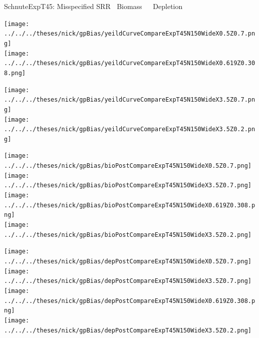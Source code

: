 \documentclass[ xcolor = pdftex, dvipsnames, table ]{beamer}
\begin{document}
%
\begin{frame}{SchnuteExpT45: Misspecified SRR $~$ Biomass $~~~~$ Depletion}
$~$
\hspace*{-1.25cm}
\begin{minipage}[h!]{0.25\textwidth}
\texttt{[image: ../../../theses/nick/gpBias/yeildCurveCompareExpT45N150WideX0.5Z0.7.png]}\\
\texttt{[image: ../../../theses/nick/gpBias/yeildCurveCompareExpT45N150WideX0.619Z0.308.png]}
\end{minipage}
\begin{minipage}[h!]{0.25\textwidth}
\hspace*{0.45cm}
\texttt{[image: ../../../theses/nick/gpBias/yeildCurveCompareExpT45N150WideX3.5Z0.7.png]}\\
\hspace*{0.45cm}
\texttt{[image: ../../../theses/nick/gpBias/yeildCurveCompareExpT45N150WideX3.5Z0.2.png]}
\end{minipage}
\begin{minipage}[h!]{0.25\textwidth}
\vspace{-0.1cm}
\hspace*{1.5cm}
\texttt{[image: ../../../theses/nick/gpBias/bioPostCompareExpT45N150WideX0.5Z0.7.png]}\\
\hspace*{1.5cm}
\texttt{[image: ../../../theses/nick/gpBias/bioPostCompareExpT45N150WideX3.5Z0.7.png]}\\
\hspace*{1.5cm}
\texttt{[image: ../../../theses/nick/gpBias/bioPostCompareExpT45N150WideX0.619Z0.308.png]}\\
\hspace*{1.5cm}
\texttt{[image: ../../../theses/nick/gpBias/bioPostCompareExpT45N150WideX3.5Z0.2.png]}
\end{minipage}
\begin{minipage}[h!]{0.25\textwidth}
\vspace{-0.1cm}
\hspace*{1.5cm}
\texttt{[image: ../../../theses/nick/gpBias/depPostCompareExpT45N150WideX0.5Z0.7.png]}\\
\hspace*{1.5cm}
\texttt{[image: ../../../theses/nick/gpBias/depPostCompareExpT45N150WideX3.5Z0.7.png]}\\
\hspace*{1.5cm}
\texttt{[image: ../../../theses/nick/gpBias/depPostCompareExpT45N150WideX0.619Z0.308.png]}\\
\hspace*{1.5cm}
\texttt{[image: ../../../theses/nick/gpBias/depPostCompareExpT45N150WideX3.5Z0.2.png]}
\end{minipage}
\end{frame}
\end{document}
